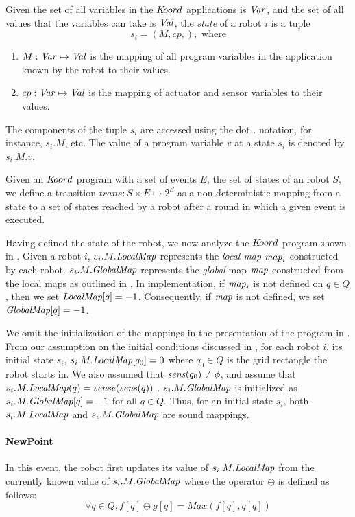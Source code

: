 \noindent
Given the set of all variables in the $K\kern-2pt oord$ applications is $\mathit{Var}$, and the set of all values that the variables can take is $\mathit{Val}$, the \emph{state} of a robot $i$ is a tuple $$s_i = ( M, cp,), \mbox{ where}$$
\begin{enumerate}
    \item $M : \mathit{Var} \mapsto \mathit{Val}$ is the mapping of all program variables in the application known by the robot to their values.
    \item $cp : \mathit{Var} \mapsto \mathit{Val}$ is the mapping of actuator and sensor variables to their values.
\end{enumerate}
The components of the tuple $s_i$ are accessed using the dot $.$ notation, for instance, $s_i.M$, etc. The value of a program variable $v$ at a state $s_i$ is denoted by $s_i.M.v$.

Given an $K\kern-2pt oord$ program with a set of events $E$, the set of states of an robot $S$, we define a transition $\mathit{trans}: S \times E \mapsto 2^S$ as a non-deterministic mapping from a state to a set of states reached by a robot after a round in which a given event is executed.

Having defined the state of the robot, we now analyze the $K\kern-2pt oord$ program shown in . Given a robot $i$, $s_i.M.\mathit{LocalMap}$ represents the \emph{local map} $\mathit{map}_i$ constructed by each robot. $s_i.M.\mathit{GlobalMap}$ represents the \emph{global} map $\mathit{map}$ constructed from the local maps as outlined in . In implementation, if $\mathit{map}_i$ is not defined on $q\in Q$, then we set $\mathit{LocalMap}[q] = -1$. Consequently, if $\mathit{map}$ is not defined, we set $\mathit{GlobalMap}[q] = -1$.


We omit the initialization of the mappings in the presentation of the program in . From our assumption on the initial conditions discussed in , for each robot $i$, its initial state $s_i$, $s_i.M.\mathit{LocalMap}[q_0] = 0$ where $q_0\in Q$ is the grid rectangle the robot starts in. We also assumed that $\mathit{sens}(q_0)\neq \phi$, and assume that $s_i.M.\mathit{LocalMap}(q) = \mathit{sense}(\mathit{sens}(q))$ . $s_i.M.\mathit{GlobalMap}$ is initialized as $s_i.M.\mathit{GlobalMap}[q] = -1$ for all $q\in Q$. Thus, for an initial state $s_i$, both $s_i.M.\mathit{LocalMap}$ and $s_i.M.\mathit{GlobalMap}$ are sound mappings.

\paragraph{NewPoint}
In this event, the robot first updates its value of $s_i.M.\mathit{LocalMap}$ from the currently known value of $s_i.M.\mathit{GlobalMap}$ where the operator $\oplus$ is defined as follows:
$$\forall q \in Q, f[q] \oplus g[q] = \mathit{Max}(f[q], q[q])$$

